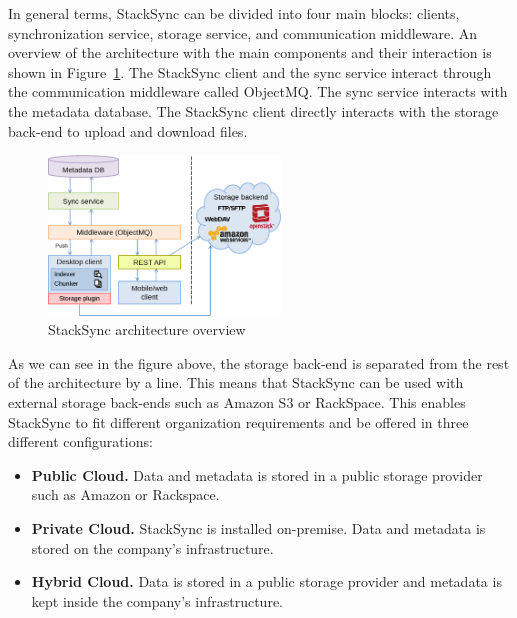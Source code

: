 

In general terms, StackSync can be divided into four main blocks: clients, synchronization service, storage service, and communication middleware. An overview of the architecture with the main components and their interaction is shown in Figure~\ref{fig:architecture}. The
StackSync client and the sync service interact through the communication middleware called ObjectMQ. The sync service interacts with the
metadata database. The StackSync client directly interacts with the storage
back-end to upload and download files.

\begin{figure}[h]
\centering
\includegraphics[width=0.55\textwidth]{figures/big_picture_v2}
\caption{StackSync architecture overview}\label{fig:architecture}
\end{figure}

As we can see in the figure above, the storage back-end is separated from the rest of the architecture by a line. This means that StackSync can be used with external storage back-ends such as Amazon S3 or RackSpace. This enables StackSync to fit different organization requirements and be offered in three different configurations:

\begin{itemize}
\item \textbf{Public Cloud.} Data and metadata is stored in a public storage provider such as Amazon or Rackspace.
\item \textbf{Private Cloud.} StackSync is installed on-premise. Data and metadata is stored on the company’s infrastructure.
\item \textbf{Hybrid Cloud.} Data is stored in a public storage provider and metadata is kept inside the company’s infrastructure.
\end{itemize}

